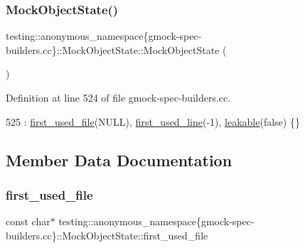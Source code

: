 \subsubsection{\texorpdfstring{Mock\+Object\+State()}{MockObjectState()}}
{\footnotesize\ttfamily testing\+::anonymous\+\_\+namespace\{gmock-\/spec-\/builders.\+cc\}\+::Mock\+Object\+State\+::\+Mock\+Object\+State (\begin{DoxyParamCaption}{ }\end{DoxyParamCaption})\hspace{0.3cm}{\ttfamily [inline]}}



Definition at line 524 of file gmock-\/spec-\/builders.\+cc.


\begin{DoxyCode}
525       : \hyperlink{structtesting_1_1anonymous__namespace_02gmock-spec-builders_8cc_03_1_1MockObjectState_a7e11d3931573056a80f4069f4c27ca8f}{first\_used\_file}(NULL), \hyperlink{structtesting_1_1anonymous__namespace_02gmock-spec-builders_8cc_03_1_1MockObjectState_a15222fe755889cc980f00448ca5ad099}{first\_used\_line}(-1), 
      \hyperlink{structtesting_1_1anonymous__namespace_02gmock-spec-builders_8cc_03_1_1MockObjectState_ab29ca1bf3d5dc51cbee32e48c4dff4ee}{leakable}(\textcolor{keyword}{false}) \{\}
\end{DoxyCode}


\subsection{Member Data Documentation}
\mbox{\label{structtesting_1_1anonymous__namespace_02gmock-spec-builders_8cc_03_1_1MockObjectState_a7e11d3931573056a80f4069f4c27ca8f}} 
\subsubsection{\texorpdfstring{first\+\_\+used\+\_\+file}{first\_used\_file}}
{\footnotesize\ttfamily const char$\ast$ testing\+::anonymous\+\_\+namespace\{gmock-\/spec-\/builders.\+cc\}\+::Mock\+Object\+State\+::first\+\_\+used\+\_\+file}




